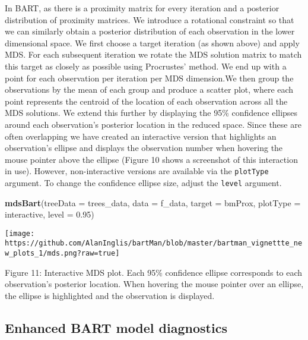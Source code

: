 \documentclass[
]{article}
\newenvironment{Shaded}{\begin{snugshade}}{\end{snugshade}}
\newcommand{\AttributeTok}[1]{\textcolor[rgb]{0.13,0.29,0.53}{#1}}
\newcommand{\FloatTok}[1]{\textcolor[rgb]{0.00,0.00,0.81}{#1}}
\newcommand{\FunctionTok}[1]{\textcolor[rgb]{0.13,0.29,0.53}{\textbf{#1}}}
\newcommand{\NormalTok}[1]{#1}
\newcommand{\StringTok}[1]{\textcolor[rgb]{0.31,0.60,0.02}{#1}}
\begin{document}
In BART, as there is a proximity matrix for every iteration and a
posterior distribution of proximity matrices. We introduce a rotational
constraint so that we can similarly obtain a posterior distribution of
each observation in the lower dimensional space. We first choose a
target iteration (as shown above) and apply MDS. For each subsequent
iteration we rotate the MDS solution matrix to match this target as
closely as possible using Procrustes' method. We end up with a point for
each observation per iteration per MDS dimension.We then group the
observations by the mean of each group and produce a scatter plot, where
each point represents the centroid of the location of each observation
across all the MDS solutions. We extend this further by displaying the
95\% confidence ellipses around each observation's posterior location in
the reduced space. Since these are often overlapping we have created an
interactive version that highlights an observation's ellipse and
displays the observation number when hovering the mouse pointer above
the ellipse (Figure 10 shows a screenshot of this interaction in use).
However, non-interactive versions are available via the
\texttt{plotType} argument. To change the confidence ellipse size,
adjust the \texttt{level} argument.

\begin{Shaded}
\begin{Highlighting}[]
\FunctionTok{mdsBart}\NormalTok{(}\AttributeTok{treeData =}\NormalTok{ trees\_data, }\AttributeTok{data =}\NormalTok{ f\_data, }\AttributeTok{target =}\NormalTok{  bmProx,}
        \AttributeTok{plotType =} \StringTok{\textquotesingle{}interactive\textquotesingle{}}\NormalTok{, }\AttributeTok{level =} \FloatTok{0.95}\NormalTok{)}
\end{Highlighting}
\end{Shaded}

\begin{center}\texttt{[image: https://github.com/AlanInglis/bartMan/blob/master/bartman\_vignettte\_new\_plots\_1/mds.png?raw=true]} \end{center}

\protect\hypertarget{fig11:fig11}{}{Figure 11: }Interactive MDS plot.
Each 95\% confidence ellipse corresponds to each observation's posterior
location. When hovering the mouse pointer over an ellipse, the ellipse
is highlighted and the observation is displayed.

\hypertarget{enhanced-bart-model-diagnostics}{%
\subsection{Enhanced BART model
diagnostics}\label{enhanced-bart-model-diagnostics}}
\end{document}
